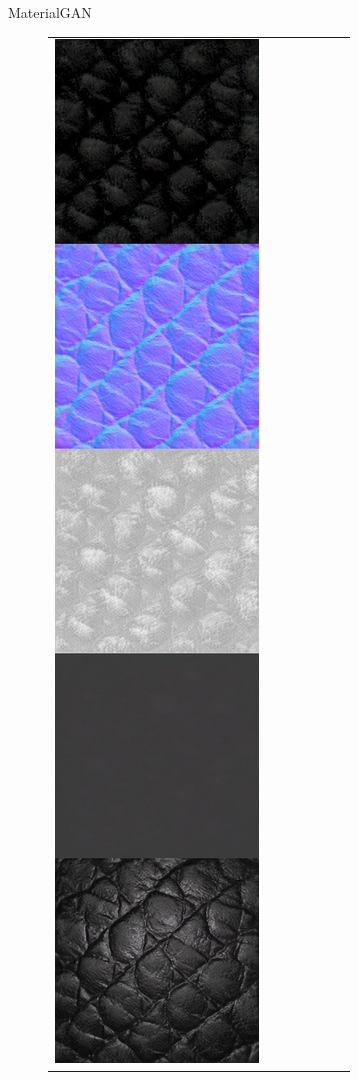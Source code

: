 \documentclass[final]{beamer}
\newlength{\twocolwid}
\newlength{\resLen}
\begin{document}
\begin{frame}[t]
\begin{columns}[t]
\begin{column}{\twocolwid}
\begin{block}{MaterialGAN}
\begin{figure}
\begin{tabular}{ccccccc}
					\includegraphics[width=\resLen]{others/matgan/11.jpg} &

\end{tabular}
\end{figure}
\end{block}
\end{column}
\end{columns}
\end{frame}
\end{document}
